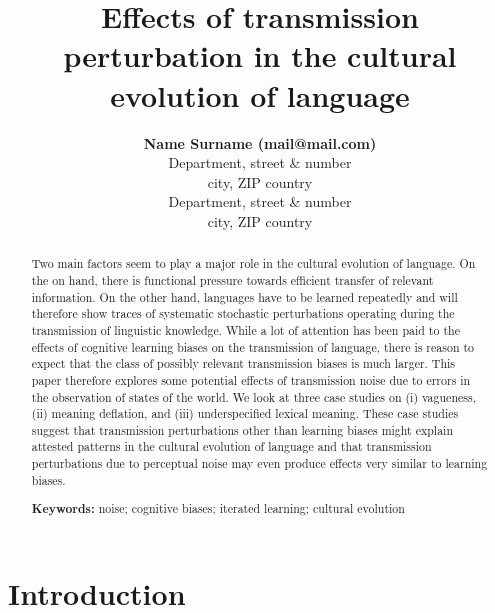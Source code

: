 \documentclass[10pt,a4paper]{article}
\title{Effects of transmission perturbation in the cultural evolution of language}
\author{{\large \bf Name Surname (mail@mail.com)} \\
  Department, street \& number \\
  city, ZIP country
  \AND {\large \bf Name Surname (mail@mail.com)} \\
  Department, street \& number \\
  city, ZIP country}
\begin{document}
\maketitle

\begin{abstract}
  Two main factors seem to play a major role in the cultural evolution of language. On the on
  hand, there is functional pressure towards efficient transfer of relevant information. On the
  other hand, languages have to be learned repeatedly and will therefore show traces of
  systematic stochastic perturbations operating during the transmission of linguistic
  knowledge. While a lot of attention has been paid to the effects of cognitive learning biases
  on the transmission of language, there is reason to expect that the class of possibly
  relevant transmission biases is much larger. This paper therefore explores some potential
  effects of transmission noise due to errors in the observation of states of the world. We
  look at three case studies on (i) vagueness, (ii) meaning deflation, and (iii) underspecified
  lexical meaning. These case studies suggest that transmission perturbations other than
  learning biases might explain attested patterns in the cultural evolution of language and
  that transmission perturbations due to perceptual noise may even produce effects very similar
  to learning biases.

\textbf{Keywords:} 
noise; cognitive biases; iterated learning; cultural evolution  
\end{abstract}


\section{Introduction}
\end{document}
